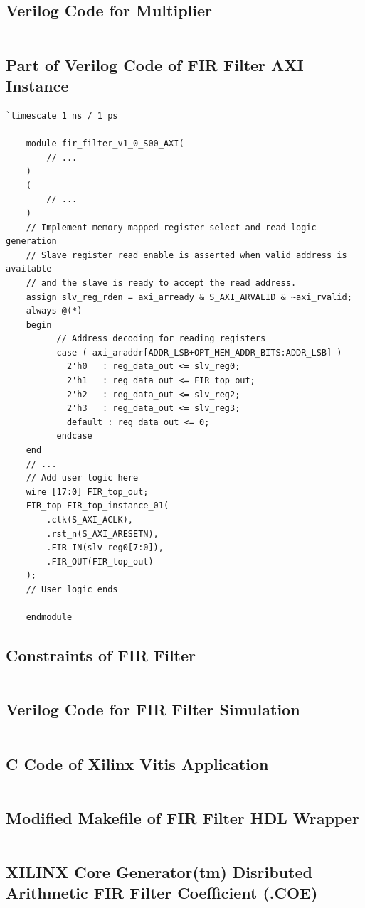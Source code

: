 \documentclass[a4paper]{article}
\begin{document}
\subsection{Verilog Code for Multiplier}
\inputminted[frame=single,bgcolor=bg,breaklines,breakanywhere,linenos]{verilog}{multiplier.v}
\subsection{Part of Verilog Code of FIR Filter AXI Instance}
\begin{verbatim}
`timescale 1 ns / 1 ps

	module fir_filter_v1_0_S00_AXI(
	    // ...
	)
	(
	    // ...
	)
	// Implement memory mapped register select and read logic generation
	// Slave register read enable is asserted when valid address is available
	// and the slave is ready to accept the read address.
	assign slv_reg_rden = axi_arready & S_AXI_ARVALID & ~axi_rvalid;
	always @(*)
	begin
	      // Address decoding for reading registers
	      case ( axi_araddr[ADDR_LSB+OPT_MEM_ADDR_BITS:ADDR_LSB] )
	        2'h0   : reg_data_out <= slv_reg0;
	        2'h1   : reg_data_out <= FIR_top_out;
	        2'h2   : reg_data_out <= slv_reg2;
	        2'h3   : reg_data_out <= slv_reg3;
	        default : reg_data_out <= 0;
	      endcase
	end
	// ...
	// Add user logic here
    wire [17:0] FIR_top_out;
    FIR_top FIR_top_instance_01(
        .clk(S_AXI_ACLK),
        .rst_n(S_AXI_ARESETN),
        .FIR_IN(slv_reg0[7:0]),
        .FIR_OUT(FIR_top_out)
    );
	// User logic ends
	
	endmodule
\end{verbatim}
\subsection{Constraints of FIR Filter}
\inputminted[frame=single,bgcolor=bg,breaklines,breakanywhere,linenos]{text}{constraints.xdc}
\subsection{Verilog Code for FIR Filter Simulation}
\inputminted[frame=single,bgcolor=bg,breaklines,breakanywhere,linenos]{verilog}{FIR_test.v}
\subsection{C Code of Xilinx Vitis Application}
\inputminted[frame=single,bgcolor=bg,breaklines,breakanywhere,linenos]{c}{helloworld.c}
\subsection{Modified Makefile of FIR Filter HDL Wrapper}
\inputminted[frame=single,bgcolor=bg,breaklines,breakanywhere,linenos]{makefile}{Makefile}
\subsection{XILINX Core Generator(tm) Disributed Arithmetic FIR Filter Coefficient (.COE)}
\inputminted[frame=single,bgcolor=bg,breaklines,breakanywhere,linenos]{text}{FIR.coe}
\end{document}
